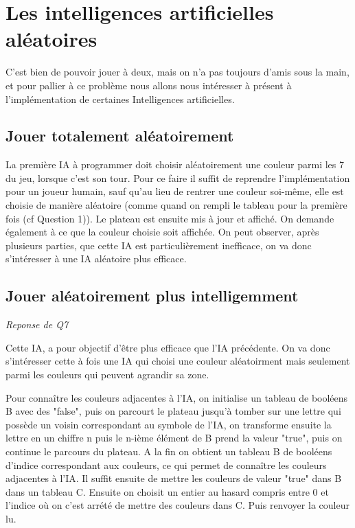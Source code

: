 \documentclass[a4paper,11pt]{article}
\begin{document}

\section{Les intelligences artificielles aléatoires}

C'est bien de pouvoir jouer à deux, mais on n'a pas toujours d'amis sous la
main, et pour pallier à ce problème nous allons nous intéresser à présent 
à l'implémentation de certaines Intelligences artificielles.

\subsection{Jouer totalement aléatoirement}

La première IA à programmer doit choisir aléatoirement une couleur parmi 
les 7 du jeu, lorsque c'est son tour. Pour ce faire il suffit de reprendre 
l'implémentation pour un joueur humain, sauf qu'au lieu de rentrer une couleur
soi-même, elle est choisie de manière aléatoire (comme quand on rempli le tableau
pour la première fois (cf Question 1)). Le plateau est ensuite mis à jour 
et affiché. On demande également à ce que la couleur choisie soit affichée.
On peut observer, après plusieurs parties, que cette IA est particulièrement 
inefficace, on va donc s'intéresser à une IA aléatoire plus efficace.


\subsection{Jouer aléatoirement plus intelligemment}
\emph{Reponse de Q7}

Cette IA, a pour objectif d'être plus efficace que l'IA précédente. On va donc
s'intéresser cette à fois une IA qui choisi une couleur aléatoirment mais 
seulement parmi les couleurs qui peuvent agrandir sa zone. 

Pour connaître les couleurs adjacentes à l'IA, on initialise un tableau de
booléens B avec des "false", puis on parcourt le plateau jusqu'à tomber sur une lettre qui possède 
un voisin correspondant au symbole de l'IA, on transforme ensuite la lettre 
en un chiffre n puis le n-ième élément de B prend la valeur "true", puis on continue
le parcours du plateau. A la fin on obtient un tableau B de booléens d'indice correspondant aux couleurs, ce qui permet de connaître
les couleurs adjacentes à l'IA. Il suffit ensuite de mettre les couleurs de valeur "true" dans B dans un tableau C. Ensuite on choisit un entier au hasard compris entre 0 et l'indice où on c'est arrété de mettre des couleurs dans C. Puis renvoyer la couleur lu.
\end{document}
